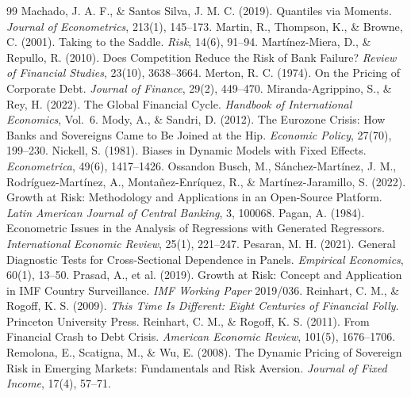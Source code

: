 \begin{thebibliography}{99}
 Machado, J. A. F., \& Santos Silva, J. M. C. (2019). Quantiles via Moments. \textit{Journal of Econometrics}, 213(1), 145--173.
 Martin, R., Thompson, K., \& Browne, C. (2001). Taking to the Saddle. \textit{Risk}, 14(6), 91--94.
 Martínez-Miera, D., \& Repullo, R. (2010). Does Competition Reduce the Risk of Bank Failure? \textit{Review of Financial Studies}, 23(10), 3638--3664.
 Merton, R. C. (1974). On the Pricing of Corporate Debt. \textit{Journal of Finance}, 29(2), 449--470.
 Miranda-Agrippino, S., \& Rey, H. (2022). The Global Financial Cycle. \textit{Handbook of International Economics}, Vol.\ 6.
 Mody, A., \& Sandri, D. (2012). The Eurozone Crisis: How Banks and Sovereigns Came to Be Joined at the Hip. \textit{Economic Policy}, 27(70), 199--230.
 Nickell, S. (1981). Biases in Dynamic Models with Fixed Effects. \textit{Econometrica}, 49(6), 1417--1426.
 Ossandon Busch, M., Sánchez-Martínez, J. M., Rodríguez-Martínez, A., Montañez-Enríquez, R., \& Martínez-Jaramillo, S. (2022). Growth at Risk: Methodology and Applications in an Open-Source Platform. \textit{Latin American Journal of Central Banking}, 3, 100068.
 Pagan, A. (1984). Econometric Issues in the Analysis of Regressions with Generated Regressors. \textit{International Economic Review}, 25(1), 221--247.
 Pesaran, M. H. (2021). General Diagnostic Tests for Cross-Sectional Dependence in Panels. \textit{Empirical Economics}, 60(1), 13--50.
 Prasad, A., et al. (2019). Growth at Risk: Concept and Application in IMF Country Surveillance. \textit{IMF Working Paper} 2019/036.
 Reinhart, C. M., \& Rogoff, K. S. (2009). \textit{This Time Is Different: Eight Centuries of Financial Folly}. Princeton University Press.
 Reinhart, C. M., \& Rogoff, K. S. (2011). From Financial Crash to Debt Crisis. \textit{American Economic Review}, 101(5), 1676--1706.
 Remolona, E., Scatigna, M., \& Wu, E. (2008). The Dynamic Pricing of Sovereign Risk in Emerging Markets: Fundamentals and Risk Aversion. \textit{Journal of Fixed Income}, 17(4), 57--71.

\end{thebibliography}
